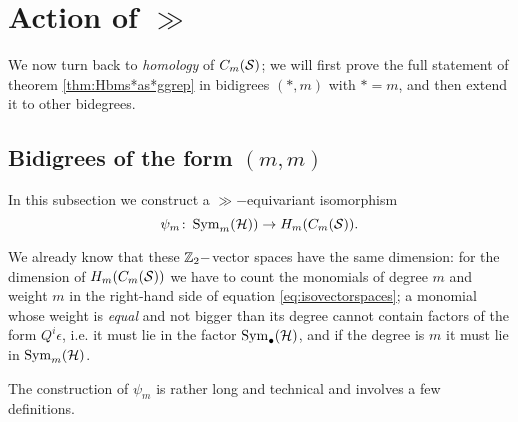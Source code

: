 \section{Action of $\gg$}
We now turn back to \emph{homology} of $C_m(\mathcal{S})$; we will first prove the full statement of theorem
\ref{thm:Hbms*as*ggrep} in bidigrees $(*,m)$ with $*=m$, and then extend it to other bidegrees.

\subsection{Bidigrees of the form $(m,m)$}
In this subsection we construct a $\gg-$equivariant isomorphism 
\[
\psi_m\colon \operatorname{Sym}_m(\mathcal{H}))\to H_m(C_m(\mathcal{S})).
\]

We already know that these $\mathbb{Z}_2-$vector spaces have the same dimension:
for the dimension of $H_m(C_m(\mathcal{S}))$ we have to count the monomials of degree $m$ and weight $m$
in the right-hand side of equation \ref{eq:isovectorspaces}; a monomial whose
weight is \emph{equal} and not bigger than its degree cannot contain factors of the form
$Q^i\epsilon$, i.e. it must lie in the factor $\operatorname{Sym}_{\bullet}(\mathcal{H})$, and if the degree
is $m$ it must lie in $\operatorname{Sym}_m(\mathcal{H})$.
% 


The construction of $\psi_m$ is rather long and technical and involves a few definitions.


